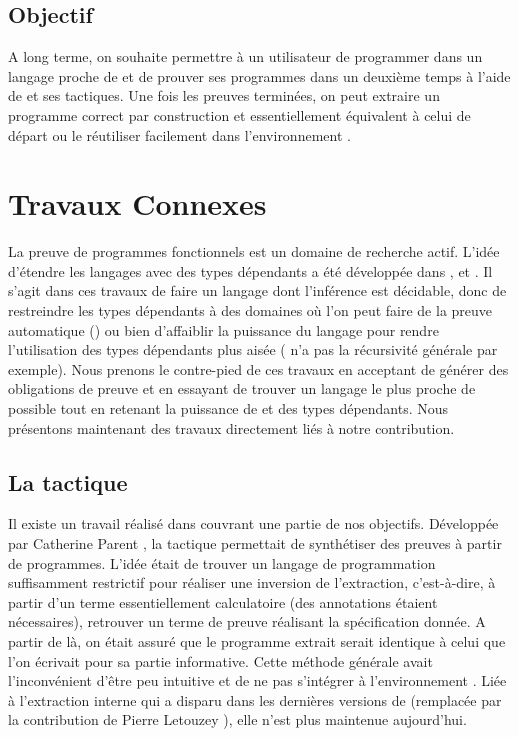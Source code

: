 \subsection{Objectif}
A long terme, on souhaite permettre \`a un utilisateur de programmer dans
un langage proche de \ML{} et de prouver ses programmes dans un deuxi\`eme
temps \`a l'aide de \Coq{} et ses tactiques. Une fois les preuves
termin\'ees, on peut extraire un programme correct par construction et
essentiellement \'equivalent \`a celui de d\'epart ou le r\'eutiliser facilement
dans l'environnement \Coq{}.

\section{Travaux Connexes}

La preuve de programmes fonctionnels est un domaine de recherche
actif. L'id\'ee d'\'etendre les langages \ML{} avec des types d\'ependants a
\'et\'e d\'evelopp\'ee dans \DML{} \cite{XiPfenning1999DTP}, \Cayenne{}
\cite{Augustsson99} et \Omegapdx{} \cite{Omega}. Il
s'agit dans ces travaux de faire un langage dont l'inf\'erence est d\'ecidable, donc
de restreindre les types d\'ependants \`a des domaines o\`u l'on peut faire de
la preuve automatique (\DML{}) ou bien d'affaiblir la puissance du langage
pour rendre l'utilisation des types d\'ependants plus ais\'ee (\Cayenne{}
n'a pas la r\'ecursivit\'e g\'en\'erale par exemple). Nous prenons le
contre-pied de ces travaux en acceptant de g\'en\'erer des obligations de
preuve et en essayant de trouver un langage le plus proche de \ML{}
possible tout en retenant la puissance de \Coq{} et des types
d\'ependants. Nous pr\'esentons maintenant des travaux directement li\'es \`a
notre contribution.


\subsection{La tactique \Program}
Il existe un travail r\'ealis\'e dans \Coq{} couvrant une partie de nos objectifs.
D\'evelopp\'ee par Catherine Parent \cite{conf/mpc/Parent95}, 
la tactique \Program{} permettait de synth\'etiser des preuves \`a partir de
programmes. L'id\'ee \'etait de trouver un langage de programmation
suffisamment restrictif pour r\'ealiser une inversion de l'extraction, 
c'est-\`a-dire, \`a partir d'un terme essentiellement calculatoire
(des annotations \'etaient n\'ecessaires), retrouver un terme de preuve
r\'ealisant la sp\'ecification donn\'ee. 
A partir de l\`a, on \'etait assur\'e que le programme extrait serait
identique \`a celui que l'on \'ecrivait pour sa partie informative. Cette
m\'ethode g\'en\'erale avait l'inconv\'enient d'\^etre peu intuitive et de ne pas
s'int\'egrer \`a l'environnement \Coq. Li\'ee \`a l'extraction interne qui
a disparu dans les derni\`eres versions de \Coq{} (remplac\'ee par la
contribution de Pierre Letouzey \cite{LetouzeyPhD}), elle n'est plus 
maintenue aujourd'hui.

